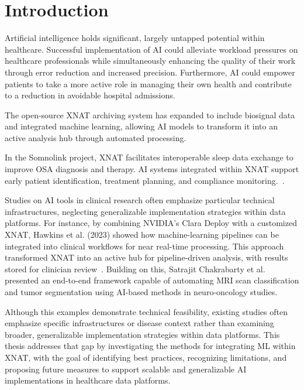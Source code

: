

\chapter{Introduction}

Artificial intelligence holds significant, largely untapped potential within healthcare. Successful implementation of \ac{AI} could alleviate workload pressures on healthcare professionals while simultaneously enhancing the quality of their work through error reduction and increased precision. Furthermore, AI could empower patients to take a more active role in managing their own health and contribute to a reduction in avoidable hospital admissions.~\cite{aung_promise_2021}

The open-source XNAT archiving system has expanded to include biosignal data and integrated machine learning, allowing AI models to transform it into an active analysis hub through automated processing.~\cite{marcus_extensible_2007}

In the Somnolink project, XNAT facilitates interoperable sleep data exchange to improve \ac{OSA} diagnosis and therapy. AI systems integrated within XNAT support early patient identification, treatment planning, and compliance monitoring.~\cite{internetredaktion_somnolink_nodate}.

Studies on AI tools in clinical research often emphasize particular technical infrastructures, neglecting generalizable implementation strategies within data platforms. For instance, by combining NVIDIA’s Clara Deploy with a customized XNAT, Hawkins et al. (2023) showed how machine-learning pipelines can be integrated into clinical workflows for near real-time processing. This approach transformed XNAT into an active hub for pipeline-driven analysis, with results stored for clinician review~\cite{hawkins_implementation_2023}. Building on this, Satrajit Chakrabarty et al. ~\cite{chakrabarty_deep_2023} presented an end-to-end framework capable of automating \ac{MRI} scan classification and tumor segmentation using AI-based methods in neuro-oncology studies.


Although this examples demonstrate technical feasibility, existing studies often emphasize specific infrastructures or disease context rather than examining broader, generalizable implementation strategies within data platforms. This thesis addresses that gap by investigating the methods for integrating \ac{ML} within XNAT, with the goal of identifying best practices, recognizing limitations, and proposing future measures to support scalable and generalizable AI implementations in healthcare data platforms.



 

